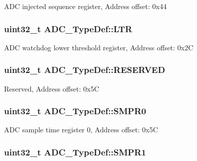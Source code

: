 A\-D\-C injected sequence register, Address offset\-: 0x44 \hypertarget{struct_a_d_c___type_def_afdaf8050fb01739206a92c9ad610f396}{
\subsubsection[{L\-T\-R}]{ uint32\-\_\-t A\-D\-C\-\_\-\-Type\-Def\-::\-L\-T\-R}}\label{struct_a_d_c___type_def_afdaf8050fb01739206a92c9ad610f396}
A\-D\-C watchdog lower threshold register, Address offset\-: 0x2\-C \hypertarget{struct_a_d_c___type_def_a42da90f4569cf1a052f1d26e409bf917}{
\subsubsection[{R\-E\-S\-E\-R\-V\-E\-D}]{\setlength{\rightskip}{0pt plus 5cm}uint32\-\_\-t A\-D\-C\-\_\-\-Type\-Def\-::\-R\-E\-S\-E\-R\-V\-E\-D}}\label{struct_a_d_c___type_def_a42da90f4569cf1a052f1d26e409bf917}
Reserved, Address offset\-: 0x5\-C \hypertarget{struct_a_d_c___type_def_afaad4e722a535b9881668f07b898daa2}{
\subsubsection[{S\-M\-P\-R0}]{ uint32\-\_\-t A\-D\-C\-\_\-\-Type\-Def\-::\-S\-M\-P\-R0}}\label{struct_a_d_c___type_def_afaad4e722a535b9881668f07b898daa2}
A\-D\-C sample time register 0, Address offset\-: 0x5\-C \hypertarget{struct_a_d_c___type_def_a73009a8122fcc628f467a4e997109347}{
\subsubsection[{S\-M\-P\-R1}]{ uint32\-\_\-t A\-D\-C\-\_\-\-Type\-Def\-::\-S\-M\-P\-R1}}\label{struct_a_d_c___type_def_a73009a8122fcc628f467a4e997109347}
